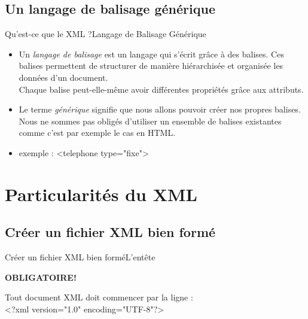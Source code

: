 \documentclass{beamer}
\begin{document}
\subsection{Un langage de balisage générique}
\begin{frame}{Qu'est-ce que le XML ?}{Langage de Balisage Générique}
  \begin{itemize}
    \item {
        Un \textit{langage de balisage} est un langage qui s'écrit grâce à des balises. Ces balises permettent de structurer de manière hiérarchisée et organisée les données d'un document.\\
        Chaque balise peut-elle-même avoir différentes propriétés grâce aux attributs.
        } \pause %
      \item {
        Le terme \textit{générique} signifie que nous allons pouvoir créer nos propres balises. Nous ne sommes pas obligés d'utiliser un ensemble de balises existantes comme c'est par exemple le cas en HTML.
        } \pause
         \item {exemple : \textless telephone type="fixe"\textgreater}
  \end{itemize}
\end{frame}



\section{Particularités du XML}

\subsection{Créer un fichier XML bien formé}

\begin{frame}{Créer un fichier XML bien formé}{L'entête}
\begin{block}{
 \begin{center}
  \textbf{OBLIGATOIRE!}
  \end{center}
  }
  \begin{center}
Tout document XML doit commencer par la ligne :\\
    {\color{red}
    \textless?xml version="1.0" encoding="UTF-8"?\textgreater}
  \end{center}
 \end{block}
\end{frame}
\end{document}
